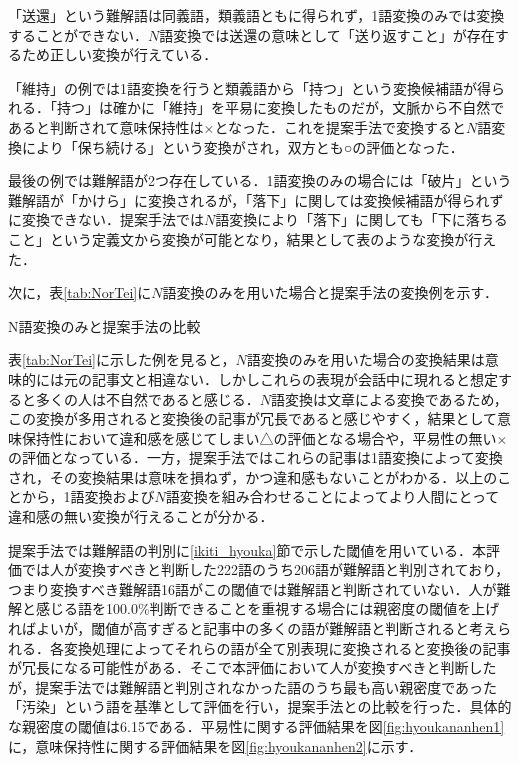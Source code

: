 \documentclass[japanese]{jnlp_1.4}
\begin{document}
「送還」という難解語は同義語，類義語ともに得られず，1語変換のみでは変換することができない．$N$語変換では送還の意味として「送り返すこと」が存在するため正しい変換が行えている．

「維持」の例では1語変換を行うと類義語から「持つ」という変換候補語が得られる．「持つ」は確かに「維持」を平易に変換したものだが，文脈から不自然であると判断されて意味保持性は×となった．これを提案手法で変換すると$N$語変換により「保ち続ける」という変換がされ，双方とも○の評価となった．

最後の例では難解語が2つ存在している．1語変換のみの場合には「破片」という難解語が「かけら」に変換されるが，「落下」に関しては変換候補語が得られずに変換できない．提案手法では$N$語変換により「落下」に関しても「下に落ちること」という定義文から変換が可能となり，結果として表のような変換が行えた．

次に，表\ref{tab:NorTei}に$N$語変換のみを用いた場合と提案手法の変換例を示す．

\begin{table}[t]
\caption{N語変換のみと提案手法の比較}
\label{tab:NorTei}

\end{table}

表\ref{tab:NorTei}に示した例を見ると，$N$語変換のみを用いた場合の変換結果は意味的には元の記事文と相違ない．しかしこれらの表現が会話中に現れると想定すると多くの人は不自然であると感じる．$N$語変換は文章による変換であるため，この変換が多用されると変換後の記事が冗長であると感じやすく，結果として意味保持性において違和感を感じてしまい△の評価となる場合や，平易性の無い×の評価となっている．一方，提案手法ではこれらの記事は1語変換によって変換され，その変換結果は意味を損ねず，かつ違和感もないことがわかる．以上のことから，1語変換および{$N$}語変換を組み合わせることによってより人間にとって違和感の無い変換が行えることが分かる．

提案手法では難解語の判別に\ref{ikiti_hyouka}節で示した閾値を用いている．本評価では人が変換すべきと判断した222語のうち206語が難解語と判別されており，つまり変換すべき難解語16語がこの閾値では難解語と判断されていない．人が難解と感じる語を100.0\%判断できることを重視する場合には親密度の閾値を上げればよいが，閾値が高すぎると記事中の多くの語が難解語と判断されると考えられる．各変換処理によってそれらの語が全て別表現に変換されると変換後の記事が冗長になる可能性がある．そこで本評価において人が変換すべきと判断したが，提案手法では難解語と判別されなかった語のうち最も高い親密度であった「汚染」という語を基準として評価を行い，提案手法との比較を行った．具体的な親密度の閾値は6.15である．平易性に関する評価結果を図\ref{fig:hyoukananhen1}に，意味保持性に関する評価結果を図\ref{fig:hyoukananhen2}に示す．
\end{document}
